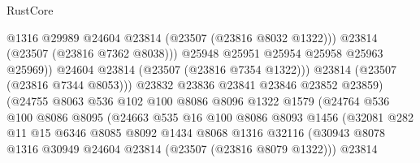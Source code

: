 \begin{lexlean}{RustCore}
\begin{coremodule}
                                        @1316
                                        @29989
                                        @24604
                                        @23814
                                        (@23507 (@23816 @8032 @1322)))
                                      @23814
                                      (@23507 (@23816 @7362 @8038)))
                                    @25948
                                    @25951
                                    @25954
                                    @25958
                                    @25963
                                    @25969))
                                @24604
                                @23814
                                (@23507 (@23816 @7354 @1322)))
                              @23814
                              (@23507 (@23816 @7344 @8053)))
                            @23832
                            @23836
                            @23841
                            @23846
                            @23852
                            @23859)
                          (@24755
                            @8063
                            @536
                            @102
                            @100
                            @8086
                            @8096
                            @1322
                            @1579
                            (@24764
                              @536
                              @100
                              @8086
                              @8095
                              (@24663
                                @535
                                @16
                                @100
                                @8086
                                @8093
                                @1456
                                (@32081
                                  @282
                                  @11
                                  @15
                                  @6346
                                  @8085
                                  @8092
                                  @1434
                                  @8068
                                  @1316
                                  @32116
                                  (@30943
                                    @8078
                                    @1316
                                    @30949
                                    @24604
                                    @23814
                                    (@23507 (@23816 @8079 @1322)))
                                  @23814

\end{coremodule}
\end{lexlean}

